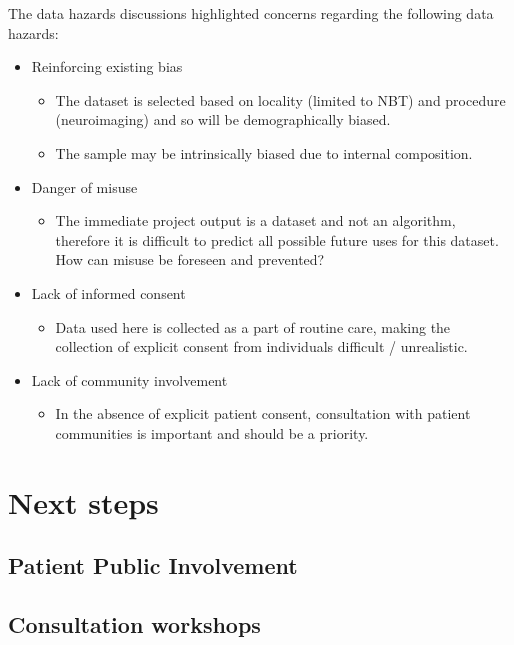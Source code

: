 \documentclass{article}
\begin{document}
The data hazards discussions highlighted concerns regarding the
following data hazards:

\begin{itemize}
\item Reinforcing existing bias
  \begin{itemize}
  \item The dataset is selected based on locality (limited to NBT)
    and procedure (neuroimaging) and so will be demographically
    biased.
  \item The sample may be intrinsically biased due to internal composition.
  \end{itemize}
\item Danger of misuse
  \begin{itemize}
  \item The immediate project output is a dataset and not an
    algorithm, therefore it is difficult to predict all possible
    future uses for this dataset. How can misuse be foreseen and prevented?
  \end{itemize}
\item Lack of informed consent
  \begin{itemize}
  \item Data used here is collected as a part of routine care, making
    the collection of explicit consent from individuals difficult / unrealistic.
  \end{itemize}     
\item Lack of community involvement
  \begin{itemize}
  \item In the absence of explicit patient consent, consultation with
    patient communities is important and should be a priority.
  \end{itemize}     
\end{itemize}


\section{Next steps}


\subsection{Patient Public Involvement}

\subsection{Consultation workshops}
\end{document}
